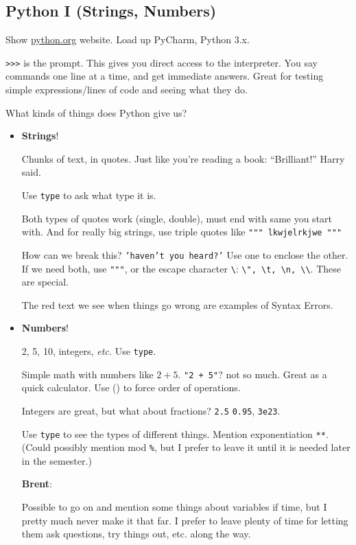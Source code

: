 \documentclass{article}
\newcommand{\etc}{\emph{etc.}\xspace}
\newenvironment{reflect}[1]
{
  \noindent
  \begin{lrbox}{\reflectbox}
    \begin{minipage}[t]{\textwidth}
      \textbf{#1}:
}{
    \end{minipage}
  \end{lrbox}
  \fbox{\usebox{\reflectbox}}
}
\begin{document}
\subsection*{Python I (Strings, Numbers)}

Show \url{python.org} website.  Load up PyCharm, Python 3.x.

\texttt{>>>} is the prompt.  This gives you direct access to the
interpreter.  You say commands one line at a time, and get immediate
answers.  Great for testing simple expressions/lines of code and
seeing what they do.

What kinds of things does Python give us?

\begin{itemize}
\item \textbf{Strings}!

  Chunks of text, in quotes. Just like you're reading a book:
  ``Brilliant!'' Harry said.

  Use \texttt{type} to ask what type it is.

  Both types of quotes work (single, double), must end with same you
  start with. And for really big strings, use triple quotes like
  \texttt{""" lkwjelrkjwe """}

  How can we break this? \texttt{'haven't you heard?'}  Use one to
  enclose the other.  If we need both, use \texttt{"""}, or the escape
  character \texttt{\textbackslash}: \texttt{\textbackslash ", \textbackslash t,
    \textbackslash n, \textbackslash\textbackslash}. These are special.

  The red text we see when things go wrong are examples of Syntax
  Errors.

\item \textbf{Numbers}!

  2, 5, 10, integers, \etc  Use \texttt{type}.

  Simple math with numbers like $2+5$. \texttt{"2 + 5"}? not so much.
  Great as a quick calculator. Use () to force order of operations.

  Integers are great, but what about fractions? \texttt{2.5}
  \texttt{0.95}, \texttt{3e23}.

  Use \verb|type| to see the types of different things.  Mention
  exponentiation \verb|**|. (Could possibly mention mod \verb|%|, but
  I prefer to leave it until it is needed later in the semester.)

  \begin{reflect}{Brent}
    Possible to go on and mention some things about variables if time,
    but I pretty much never make it that far.  I prefer to leave
    plenty of time for letting them ask questions, try things out,
    etc. along the way.
  \end{reflect}
\end{itemize}
\end{document}
